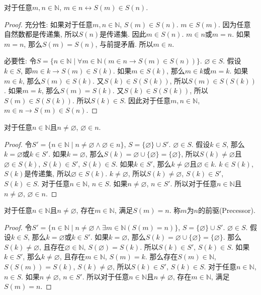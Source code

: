 \begin{proposition}
	对于任意$m,n\in \mathbb N$, $m\in n\leftrightarrow S(m)\in S(n)$.
\end{proposition}

\begin{proof}
	充分性: 如果对于任意$m,n\in \mathbb N$, $S(m)\in S(n)$. $m\in S(m)$. 因为任意自然数都是传递集, 所以$S(n)$是传递集. 因此$m\in S(n)$. $m\in n$或$m=n$. 如果$m=n$, 那么$S(m)=S(n)$, 与前提矛盾. 所以$m\in n$.

	必要性: 令$S=\{n\in \mathbb N\mid \forall m\in \mathbb N(m\in n\rightarrow S(m)\in S(n))\}$. $\varnothing \in S$. 假设$k\in S$, 即$m\in k\rightarrow S(m)\in S(k)$. 如果$m\in S(k)$, 那么$m\in k$或$m=k$. 如果$m\in k$, 那么$S(m)\in S(k)$. 又$S(k)\in S(S(k))$, 所以$S(m)\in S(S(k))$. 如果$m=k$, 那么$S(m)=S(k)$. 又$S(k)\in S(S(k))$, 所以$S(m)\in S(S(k))$. 所以$S(k)\in S$. 因此对于任意$m,n\in \mathbb N$, $m\in n\rightarrow S(m)\in S(n)$.
\end{proof}

\begin{proposition}
	对于任意$n\in \mathbb N$且$n\neq \varnothing$, $\varnothing \in n$.
\end{proposition}

\begin{proof}
	令$S'=\{n\in \mathbb N\mid n\neq \varnothing\wedge \varnothing \in n\}$, $S=\{\varnothing\}\cup S'$. $\varnothing \in S$. 假设$k\in S$, 那么$k=\varnothing$或$k\in S'$. 如果$k=\varnothing$, 那么$S(k)=\varnothing \cup \{\varnothing\}=\{\varnothing\}$, 所以$S(k)\neq \varnothing$且$\varnothing \in S(k)$, $S(k)\in S'$, $S(k)\in S$. 如果$k\in S'$, 那么$k\neq \varnothing$且$\varnothing \in k$. $k\in S(k)$, $S(k)$是传递集, 所以$\varnothing \in S(k)$. $k\neq \varnothing$, 所以$S(k)\neq \varnothing$, $S(k)\in S'$, $S(k)\in S$. 对于任意$n\in \mathbb N$, $n \in S$. 如果$n\neq \varnothing$, $n\in S'$. 所以对于任意$n\in \mathbb N$且$n\neq \varnothing$, $\varnothing \in n$.
\end{proof}

\begin{proposition}
	对于任意$n\in \mathbb N$且$n\neq \varnothing$, 存在$m\in \mathbb N$, 满足$S(m)=n$. 称$m$为$n$的前驱(Precessor).
\end{proposition}

\begin{proof}
	令$S'=\{n\in \mathbb N\mid n\neq \varnothing\wedge \exists m\in \mathbb N(S(m)=n)\}$, $S=\{\varnothing\}\cup S'$. $\varnothing \in S$. 假设$k\in S$, 那么$k=\varnothing$或$k\in S'$. 如果$k=\varnothing$, 那么$S(k)=\varnothing \cup \{\varnothing\}=\{\varnothing\}$. 那么$S(k)\neq \varnothing$, 且存在$\varnothing \in \mathbb N$, $S(\varnothing)=S(k)$. 所以$S(k)\in S'$, $S(k)\in S$. 如果$k\in S'$, 那么$k\neq \varnothing$, 且存在$m\in \mathbb N$, $S(m)=k$. 那么存在$S(m)\in \mathbb N$, $S(S(m))=S(k)$, $S(k)\neq \varnothing$, 所以$S(k)\in S'$, $S(k)\in S$. 对于任意$n\in \mathbb N$, $n \in S$. 如果$n\neq \varnothing$, $n\in S'$. 所以对于任意$n\in \mathbb N$且$n\neq \varnothing$, 存在$m\in \mathbb N$, 满足$S(m)=n$.
\end{proof}

